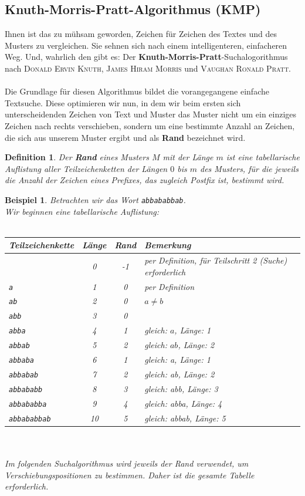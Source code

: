 \documentclass[11pt,a4paper]{scrartcl}
\newtheorem{definition}{Definition}
\newtheorem{example}{Beispiel}
\begin{document}
\subsection{Knuth-Morris-Pratt-Algorithmus (KMP)}
Ihnen ist das zu mühsam geworden, Zeichen für Zeichen des Textes und des Musters zu vergleichen. Sie sehnen sich nach einem intelligenteren, einfacheren Weg. Und, wahrlich den gibt es: Der \textbf{Knuth-Morris-Pratt}-Suchalogorithmus nach \textsc{Donald Ervin Knuth}, \textsc{James Hiram Morris} und \textsc{Vaughan Ronald Pratt}. \\\\
Die Grundlage für diesen Algorithmus bildet die vorangegangene einfache Textsuche. Diese optimieren wir nun, in dem wir beim ersten sich unterscheidenden Zeichen von Text und Muster das Muster nicht um ein einziges Zeichen nach rechts verschieben, sondern um eine bestimmte Anzahl an Zeichen, die sich aus unserem Muster ergibt und als \textbf{Rand} bezeichnet wird.
\begin{definition}
Der \textbf{Rand} eines Musters $M$ mit der Länge $m$ ist eine tabellarische Auflistung aller Teilzeichenketten der Längen $0$ bis $m$ des Musters, für die jeweils die Anzahl der Zeichen eines Prefixes, das zugleich Postfix ist, bestimmt wird.
\end{definition}
\begin{example}
Betrachten wir das Wort \texttt{abbababbab}. \\
Wir beginnen eine tabellarische Auflistung: \\\\
\begin{tabular}{|l|c|c|l|}
\hline
Teilzeichenkette & Länge & Rand & Bemerkung \\
\hline
& 0 & -1 & per Definition, für Teilschritt 2 (Suche) erforderlich \\
\texttt{a} & 1 & 0 & per Definition \\ 
\texttt{ab} & 2 & 0 & $a \neq b$ \\
\texttt{abb} & 3 & 0 & \\
\texttt{abba} & 4 & 1 & gleich: $a$, Länge: 1 \\
\texttt{abbab} & 5 & 2 & gleich: $ab$, Länge: 2 \\
\texttt{abbaba} & 6 & 1 & gleich: a, Länge: 1 \\
\texttt{abbabab} & 7 & 2 & gleich: ab, Länge: 2 \\
\texttt{abbababb} & 8 & 3 & gleich: abb, Länge: 3 \\
\texttt{abbababba} & 9 & 4 & gleich: abba, Länge: 4 \\
\texttt{abbababbab} & 10 & 5 & gleich: abbab, Länge: 5 \\
\hline 
\end{tabular} \\\\
Im folgenden Suchalgorithmus wird jeweils der Rand verwendet, um Verschiebungspositionen zu bestimmen. Daher ist die gesamte Tabelle erforderlich.
\end{example} \pagebreak
\end{document}
